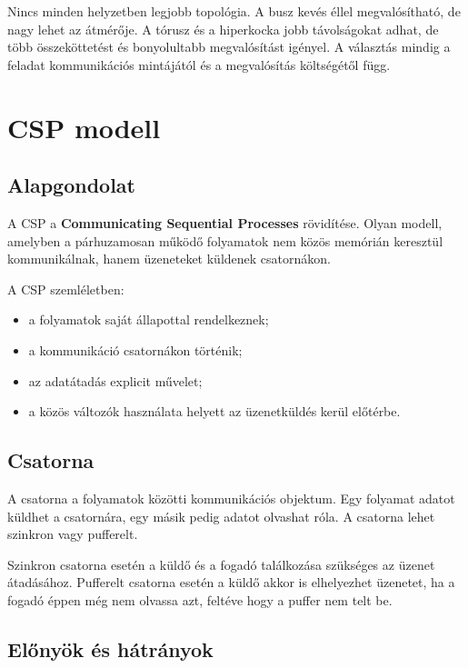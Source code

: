 \begin{warningbox}
Nincs minden helyzetben legjobb topológia. A busz kevés éllel megvalósítható, de nagy lehet az átmérője. A tórusz és a hiperkocka jobb távolságokat adhat, de több összeköttetést és bonyolultabb megvalósítást igényel. A választás mindig a feladat kommunikációs mintájától és a megvalósítás költségétől függ.
\end{warningbox}

\section{CSP modell}

\subsection{Alapgondolat}

A CSP a \textbf{Communicating Sequential Processes} rövidítése. Olyan modell, amelyben a párhuzamosan működő folyamatok nem közös memórián keresztül kommunikálnak, hanem üzeneteket küldenek csatornákon.

A CSP szemléletben:

\begin{itemize}
  \item a folyamatok saját állapottal rendelkeznek;
  \item a kommunikáció csatornákon történik;
  \item az adatátadás explicit művelet;
  \item a közös változók használata helyett az üzenetküldés kerül előtérbe.
\end{itemize}

\subsection{Csatorna}

A csatorna a folyamatok közötti kommunikációs objektum. Egy folyamat adatot küldhet a csatornára, egy másik pedig adatot olvashat róla. A csatorna lehet szinkron vagy pufferelt.

Szinkron csatorna esetén a küldő és a fogadó találkozása szükséges az üzenet átadásához. Pufferelt csatorna esetén a küldő akkor is elhelyezhet üzenetet, ha a fogadó éppen még nem olvassa azt, feltéve hogy a puffer nem telt be.

\subsection{Előnyök és hátrányok}

